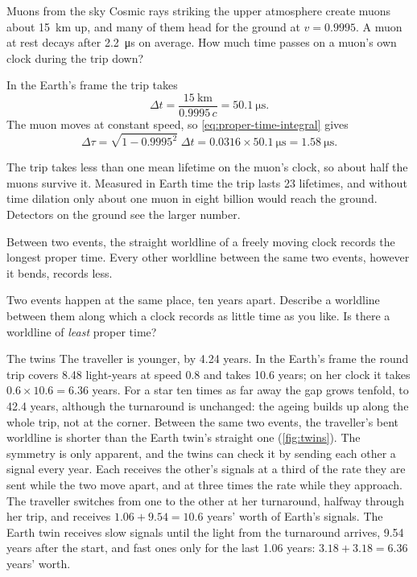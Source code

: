 \begin{example}[label=ex:muon]{Muons from the sky}
Cosmic rays striking the upper atmosphere create muons about
\SI{15}{\kilo\metre} up, and many of them head for the ground at
$v = 0.9995$. A muon at rest decays after \SI{2.2}{\micro\second} on average.
How much time passes on a muon's own clock during the trip down?

\solution In the Earth's frame the trip takes
\begin{equation*}
  \Delta t = \frac{\SI{15}{\kilo\metre}}{0.9995\,c} = \SI{50.1}{\micro\second}.
\end{equation*}
The muon moves at constant speed, so \cref{eq:proper-time-integral} gives
\begin{equation*}
  \Delta\tau = \sqrt{1 - 0.9995^{2}}\;\Delta t = 0.0316 \times \SI{50.1}{\micro\second}
  = \SI{1.58}{\micro\second}.
\end{equation*}

\discussion The trip takes less than one mean lifetime on the muon's clock, so
about half the muons survive it. Measured in Earth time the trip lasts 23
lifetimes, and without time dilation only about one muon in eight billion
would reach the ground. Detectors on the ground see the larger number.
\end{example}

\begin{keyidea}
Between two events, the straight worldline of a freely moving clock records
the longest proper time. Every other worldline between the same two events,
however it bends, records less.
\end{keyidea}

\begin{checkpoint}[label=chk:zigzag]
Two events happen at the same place, ten years apart. Describe a worldline
between them along which a clock records as little time as you like. Is there
a worldline of \emph{least} proper time?
\end{checkpoint}

\begin{revisited}{The twins}
The traveller is younger, by 4.24 years. In the Earth's frame the round trip
covers 8.48 light-years at speed 0.8 and takes 10.6 years; on her clock it
takes $0.6 \times 10.6 = 6.36$ years. For a star ten times as far away the gap
grows tenfold, to 42.4 years, although the turnaround is unchanged: the
ageing builds up along the whole trip, not at the corner. Between the same
two events, the traveller's bent worldline is shorter than the Earth twin's
straight one (\cref{fig:twins}). The symmetry is only apparent, and the twins
can check it by sending each other a signal every year. Each receives the
other's signals at a third of the rate they are sent while the two move
apart, and at three times the rate while they approach. The traveller
switches from one to the other at her turnaround, halfway through her trip,
and receives $1.06 + 9.54 = 10.6$ years' worth of Earth's signals. The Earth
twin receives slow signals until the light from the turnaround arrives, 9.54
years after the start, and fast ones only for the last 1.06 years:
$3.18 + 3.18 = 6.36$ years' worth.
\end{revisited}

